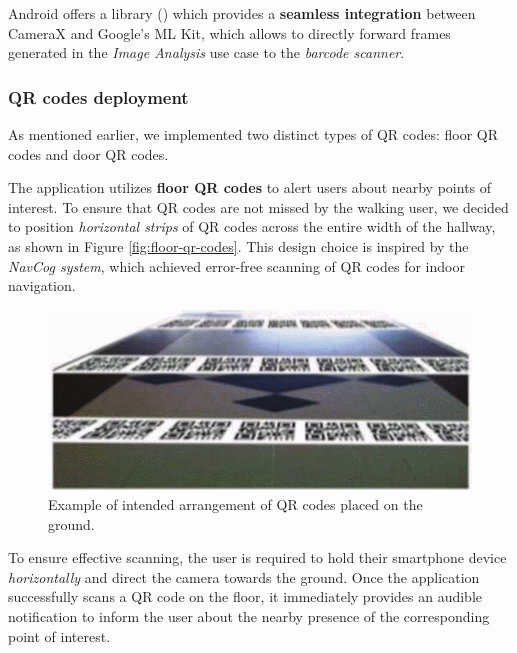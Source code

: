 Android offers a library () which provides a \textbf{seamless integration} between CameraX and Google's ML Kit\cite{androidx.camera.mlkit.vision}, which allows to directly forward frames generated in the \textit{Image Analysis} use case to the \textit{barcode scanner}.\cite{androidx.camera.mlkit.vision.MlKitAnalyzer}



\subsubsection{QR codes deployment}

As mentioned earlier, we implemented two distinct types of QR codes: floor QR codes and door QR codes.

The application utilizes \textbf{floor QR codes} to alert users about nearby points of interest. 
To ensure that QR codes are not missed by the walking user, we decided to position \textit{horizontal strips} of QR codes across the entire width of the hallway, as shown in Figure \vref{fig:floor-qr-codes}. 
This design choice is inspired by the \textit{NavCog system}\cite{indoor-navigation-qr-codes}, which achieved error-free scanning of QR codes for indoor navigation.

\begin{figure}[H]
    \centering
    \includegraphics[width=\columnwidth]{chapters/architecture/images/ground-qr-codes.png}
    \caption{Example of intended arrangement of QR codes placed on the ground.\cite{indoor-navigation-qr-codes}}
    \label{fig:floor-qr-codes}
\end{figure}

To ensure effective scanning, the user is required to hold their smartphone device \textit{horizontally} and direct the camera towards the ground. Once the application successfully scans a QR code on the floor, it immediately provides an audible notification to inform the user about the nearby presence of the corresponding point of interest.

